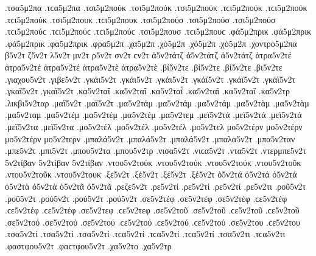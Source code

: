 {.τσα5μ2πα .τϲα5μ2πα 
.τσι5μ2πούκ .τσι5μ2πούκ .τσι5μ2πούκ .τϲι5μ2πούκ .τϲι5μ2πούκ .τϲι5μ2πούκ   %
.τσι5μ2πουκ .τϲι5μ2πουκ 
.τσι5μ2πούσ .τσι5μ2πούσ .τσι5μ2πούσ .τϲι5μ2πούϲ .τϲι5μ2πούϲ .τϲι5μ2πούϲ   %
.τσι5μ2πουσ .τϲι5μ2πουϲ 
.φά5μ2πρικ .φά5μ2πρικ .φά5μ2πρικ   %
.φα5μ2πρικ 
.φρα5μ2π   %
.χα5μ2π   %
.χό5μ2π .χό5μ2π .χό5μ2π   %
.χοντρο5μ2πα   %
β5ν2τ 
ζ5ν2τ 
λ5ν2τ 
μν2τ 
ρ5ν2τ 
σν2τ ϲν2τ 
ἀ5ν2τάτζ ἀ5ν2τάτζ ἀ5ν2τάτζ   %
ἀτρα5ν2τέ ἀτρα5ν2τέ ἀτρα5ν2τέ   %
ἀτρα5ν2τὲ ἀτρα5ν2τὲ 
.βί5ν2τε .βί5ν2τε .βί5ν2τε   %
.βι5ν2τε 
.γιαχου5ν2τ   %
.γιβε5ν2τ   %
.γκάι5ν2τ .γκάι5ν2τ .γκάι5ν2τ   %
.γκάϊ5ν2τ .γκάϊ5ν2τ .γκάϊ5ν2τ 
.γκαϊ5ν2τ .γκαϊ5ν2τ 
.κα5ν2ταΐ .κα5ν2ταΐ .κα5ν2ταΐ   %
.κα5ν2ταϊ .κα5ν2ταϊ 
.κα5ν2τρ   %
.λικβι5ν2ταρ   %
.μαϊ5ν2τ .μαϊ5ν2τ   %
.μα5ν2τάμ .μα5ν2τάμ .μα5ν2τάμ   %
.μα5ν2τὰμ .μα5ν2τὰμ 
.μα5ν2ταμ 
.μα5ν2τέμ .μα5ν2τέμ .μα5ν2τέμ   %
.μα5ν2τεμ 
.μεϊ5ν2τά .μεϊ5ν2τά .μεϊ5ν2τά   %
.μεϊ5ν2τα .μεϊ5ν2τα 
.μο5ν2τέλ .μο5ν2τέλ .μο5ν2τέλ   %
.μο5ν2τελ 
μο5ν2τέρν μο5ν2τέρν μο5ν2τέρν   %
μο5ν2τερν 
.μπαλά5ν2τ .μπαλά5ν2τ .μπαλά5ν2τ   %
.μπαλα5ν2τ 
.μπα5ν2ταν   %
.μπε5ν2τ   %
.μπι5ν2τ   %
.μπου5ν2τα   %
.μπου5ν2τρ   %
.νισα5ν2τ .νιϲα5ν2τ   %
.ντα5ν2τ   %
.ντερμπε5ν2τ   %
5ν2τίβαν 5ν2τίβαν 5ν2τίβαν   %
.ντου5ν2τούκ .ντου5ν2τούκ .ντου5ν2τούκ   %
.ντου5ν2τοῦκ .ντου5ν2τοῦκ 
.ντου5ν2τουκ 
.ξε5ν2τ   %
.ξέ5ν2τ .ξέ5ν2τ .ξέ5ν2τ 
ὀ5ν2τά ὀ5ν2τά ὀ5ν2τά   %
ὀ5ν2τὰ ὀ5ν2τὰ 
ὀ5ν2τᾶ ὀ5ν2τᾶ 
.ρεζε5ν2τ   %
.ρε5ν2τί .ρε5ν2τί .ρε5ν2τί   %
.ρε5ν2τι 
.ροῦ5ν2τ .ροῦ5ν2τ   %
.ρού5ν2τ .ρού5ν2τ .ρού5ν2τ 
.σε5ν2τέφ .σε5ν2τέφ .σε5ν2τέφ .ϲε5ν2τέφ .ϲε5ν2τέφ .ϲε5ν2τέφ   %
.σε5ν2τεφ .ϲε5ν2τεφ 
.σε5ν2τοῦ .σε5ν2τοῦ .ϲε5ν2τοῦ .ϲε5ν2τοῦ   %
.σε5ν2τού .σε5ν2τού .σε5ν2τού .ϲε5ν2τού .ϲε5ν2τού .ϲε5ν2τού 
.σε5ν2του .ϲε5ν2του 
.τσα5ν2τί .τσα5ν2τί .τσα5ν2τί .τϲα5ν2τί .τϲα5ν2τί .τϲα5ν2τί   %
.τσα5ν2τι .τϲα5ν2τι 
.φαστφου5ν2τ .φαϲτφου5ν2τ   %
.χα5ν2το   %
.χα5ν2τρ   %
}
